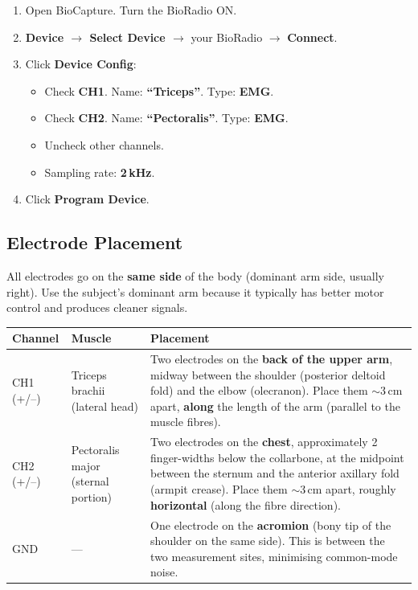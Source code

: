 \documentclass[11pt,letterpaper]{article}
\begin{document}
\begin{enumerate}[nosep]
    \item Open BioCapture.  Turn the BioRadio ON.
    \item \textbf{Device $\rightarrow$ Select Device $\rightarrow$} your BioRadio $\rightarrow$ \textbf{Connect}.
    \item Click \textbf{Device Config}:
    \begin{itemize}[nosep]
        \item Check \textbf{CH1}.  Name: \textbf{``Triceps''}.  Type: \textbf{EMG}.
        \item Check \textbf{CH2}.  Name: \textbf{``Pectoralis''}.  Type: \textbf{EMG}.
        \item Uncheck other channels.
        \item Sampling rate: \textbf{2\,kHz}.
    \end{itemize}
    \item Click \textbf{Program Device}.
\end{enumerate}

\subsection{Electrode Placement}

All electrodes go on the \textbf{same side} of the body (dominant arm side, usually right).  Use the subject's dominant arm because it typically has better motor control and produces cleaner signals.

\begin{center}
\renewcommand{\arraystretch}{1.4}
\begin{tabular}{@{} l l p{7.5cm} @{}}
\toprule
\textbf{Channel} & \textbf{Muscle} & \textbf{Placement} \\
\midrule
CH1 (+/--) & Triceps brachii (lateral head) & Two electrodes on the \textbf{back of the upper arm}, midway between the shoulder (posterior deltoid fold) and the elbow (olecranon).  Place them $\sim$3\,cm apart, \textbf{along} the length of the arm (parallel to the muscle fibres). \\
\addlinespace
CH2 (+/--) & Pectoralis major (sternal portion) & Two electrodes on the \textbf{chest}, approximately 2 finger-widths below the collarbone, at the midpoint between the sternum and the anterior axillary fold (armpit crease).  Place them $\sim$3\,cm apart, roughly \textbf{horizontal} (along the fibre direction). \\
\addlinespace
GND & --- & One electrode on the \textbf{acromion} (bony tip of the shoulder on the same side).  This is between the two measurement sites, minimising common-mode noise. \\
\bottomrule
\end{tabular}
\end{center}
\end{document}
